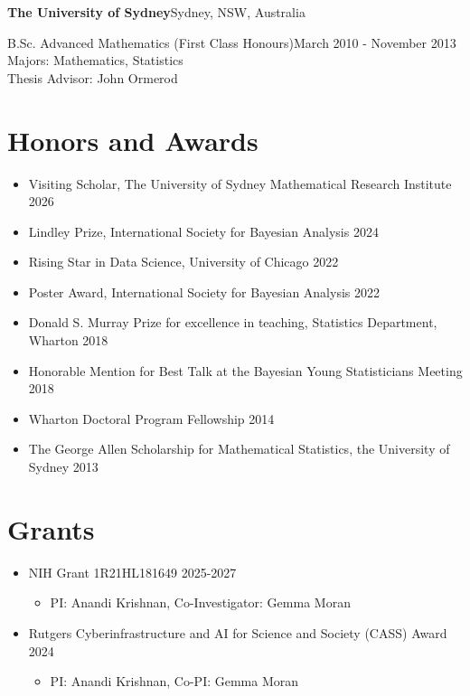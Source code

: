 \documentclass[margin,line]{res}
\newenvironment{list1}{
  \begin{list}{\ding{113}}{%
      \setlength{\itemsep}{8pt}
      \setlength{\parsep}{2pt} \setlength{\parskip}{2pt}
      \setlength{\topsep}{2pt} \setlength{\partopsep}{2pt} 
      \setlength{\leftmargin}{0.17in}}}{\end{list}}
\begin{document}
\begin{resume}
{\bf The University of Sydney}\hfill Sydney, NSW, Australia\\
\vspace*{-.1in}
\begin{list1}
\item[] B.Sc. Advanced Mathematics (First Class Honours)\hfill March 2010 - November 2013 \\
Majors: Mathematics, Statistics\\
Thesis Advisor: John Ormerod
\end{list1}

\section{\sc Honors and Awards} 
\begin{itemize}
  \item Visiting Scholar, The University of Sydney Mathematical Research Institute \hfill 2026
\item Lindley Prize, International Society for Bayesian Analysis \hfill 2024
\item Rising Star in Data Science, University of Chicago \hfill 2022
\item Poster Award, International Society for Bayesian Analysis \hfill 2022
\item Donald S. Murray Prize for excellence in teaching, Statistics Department, Wharton \hfill 2018
\item Honorable Mention for Best Talk at the Bayesian Young Statisticians Meeting \hfill 2018
\item Wharton Doctoral Program Fellowship \hfill 2014
\item The George Allen Scholarship for Mathematical Statistics, the University of Sydney \hfill 2013
\end{itemize}

\section{\sc Grants}
\begin{itemize}
    \item  NIH Grant 1R21HL181649 \hfill 2025-2027
    \begin{itemize}
      \item PI: Anandi Krishnan, Co-Investigator: Gemma Moran
    \end{itemize}
    \item Rutgers Cyberinfrastructure and AI for Science and Society (CASS) Award  \hfill 2024 
    \begin{itemize}
      \item PI: Anandi Krishnan, Co-PI: Gemma Moran
    \end{itemize}
  \end{itemize}



\end{resume}
\end{document}
